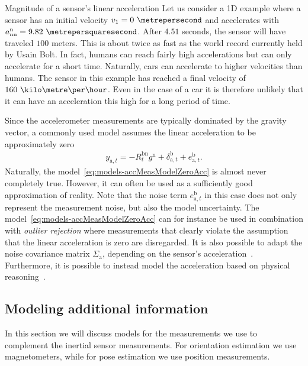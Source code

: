 \begin{myexample}{Magnitude of a sensor's linear acceleration}%
\label{ex:models-accMagnitude}%
Let us consider a 1D example where a sensor has an initial velocity $v_1 = 0~\metrepersecond$ and accelerates with $a_\text{nn}^\text{n} = 9.82~\metrepersquaresecond$. After $4.51$ seconds, the sensor will have traveled $100$ meters. This is about twice as fast as the world record currently held by Usain Bolt. In fact, humans can reach fairly high accelerations but can only accelerate for a short time. Naturally, cars can accelerate to higher velocities than humans. The sensor in this example has reached a final velocity of $160~\kilo\metre\per\hour$. Even in the case of a car it is therefore unlikely that it can have an acceleration this high for a long period of time. 
\end{myexample}

Since the accelerometer measurements are typically dominated by the gravity vector, a commonly used model assumes the linear acceleration to be approximately zero 
\begin{align}
\label{eq:models-accMeasModelZeroAcc}
y_{\text{a},t} 
= - R^{\text{bn}}_t g^\text{n}
+ \delta_{\text{a},t}^\text{b}
+ e_{\text{a},t}^\text{b}.
\end{align} 
Naturally, the model~\eqref{eq:models-accMeasModelZeroAcc} is almost never completely true. However, it can often be used as a sufficiently good approximation of reality. Note that the noise term $e_{\text{a},t}^\text{b}$ in this case does not only represent the measurement noise, but also the model uncertainty. The model~\eqref{eq:models-accMeasModelZeroAcc} can for instance be used in combination with \emph{outlier rejection} where measurements that clearly violate the assumption that the linear acceleration is zero are disregarded. It is also possible to adapt the noise covariance matrix $\Sigma_\text{a}$, depending on the sensor's acceleration~\citep{foxlin:1996,rehbinderH:2004}. Furthermore, it is possible to instead model the acceleration based on physical reasoning~\citep{luinge:2002}. 

\subsection{Modeling additional information}
\label{sec:models-addMeasModels}
In this section we will discuss models for the measurements we use to complement the inertial sensor measurements. For orientation estimation we use magnetometers, while for pose estimation we use position measurements.

